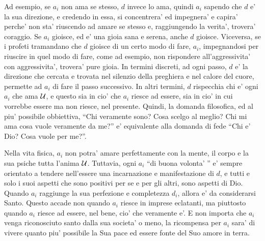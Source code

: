 Ad esempio, se $a_i$ non ama se stesso, $d$ invece lo ama, quindi $a_i$ sapendo che $d$ e' la sua direzione, e credendo in essa, si concentrera' ed impegnera' e capira' perche' non sta' riuscendo ad amare se stesso e, raggiungendo la verita', trovera' coraggio. Se $a_i$ gioisce, ed e' una gioia sana e serena, anche $d$ gioisce. Viceversa, se i profeti tramandano che $d$ gioisce di un certo modo di fare, $a_i$, impegnandosi per riuscire in quel modo di fare, come ad esempio, non rispondere all'aggressivita' con aggressivita', trovera' pure gioia. In termini discreti, ad ogni passo, $d$ e' la direzione che cercata e trovata nel silenzio della preghiera e nel calore del cuore, permette ad $a_i$ di fare il passo successivo. In altri termini, $d$ rispecchia chi e' ogni $a_i$ che ama $\mathcal{U}$, e questo sia in cio' che $a_i$ riesce ad essere, sia in cio' in cui vorrebbe essere ma non riesce, nel presente. Quindi, la domanda filosofica, ed al piu' possibile obbiettiva, ``Chi veramente sono? Cosa scelgo al meglio? Chi mi ama cosa vuole veramente da me?'' e' equivalente alla domanda di fede ``Chi e' Dio? Cosa vuole per me?''. 

Nella vita fisica, $a_i$ non potra' amare perfettamente con la mente, il corpo e la sua psiche tutta l'anima $\mathcal{U}$. Tuttavia, ogni $a_i$ ``di buona volonta' '' e' sempre orientato a tendere nell'essere una incarnazione e manifestazione di $d$, e tutti e solo i suoi aspetti che sono positivi per se e per gli altri, sono aspetti di Dio. Quando $a_i$ raggiunge la sua perfezione e completezza $d_i$, allora e' da considerarsi Santo. Questo accade non quando $a_i$ riesce in imprese eclatanti, ma piuttosto quando $a_i$ riesce ad essere, nel bene, cio' che veramente e'. E non importa che $a_i$ venga riconosciuto santo dalla sua societa' o meno, la ricompensa per $a_i$ sara' di vivere quanto piu' possibile la Sua pace ed essere fonte del Suo amore in terra.


